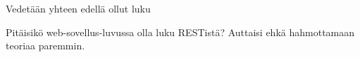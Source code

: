 Vedetään yhteen edellä ollut luku

Pitäisikö web-sovellus-luvussa olla luku RESTistä? Auttaisi ehkä hahmottamaan teoriaa paremmin.